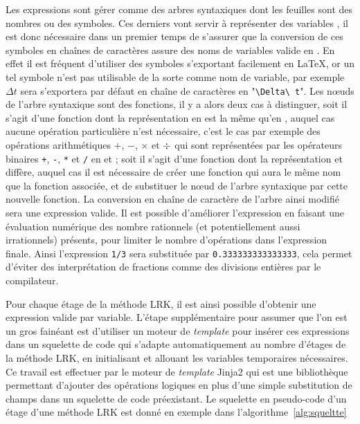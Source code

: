Les expressions \sympy{} sont gérer comme des arbres syntaxiques dont les feuilles sont des nombres ou des symboles. Ces derniers vont servir à représenter des variables \CC, il est donc nécessaire dans un premier temps de s'assurer que la conversion de ces symboles en chaînes de caractères assure des noms de variables valide en \CC. En effet il est fréquent d'utiliser des symboles s'exportant facilement en \LaTeX{}, or un tel symbole n'est pas utilisable de la sorte comme nom de variable, par exemple $\Delta t$ sera s'exportera par défaut en chaîne de caractères en "\texttt{\textbackslash Delta\textbackslash\ t}". Les nœuds de l'arbre syntaxique sont des fonctions, il y a alors deux cas à distinguer, soit il s'agit d'une fonction dont la représentation en \Python{} est la même qu'en \CC, auquel cas aucune opération particulière n'est nécessaire, c'est le cas par exemple des opérations arithmétiques $+$, $-$, $\times$ et $\divisionsymbol$ qui sont représentées par les opérateurs binaires \texttt{+}, \texttt{-}, \texttt{*} et \texttt{/} en \Python{} et \CC{} ; soit il s'agit d'une fonction dont la représentation \Python{} et \CC{} diffère, auquel cas il est nécessaire de créer une fonction \sympy{} qui aura le même nom que la fonction \CC{} associée, et de substituer le nœud de l'arbre syntaxique par cette nouvelle fonction. La conversion en chaîne de caractère de l'arbre ainsi modifié sera une expression \CC{} valide. Il est possible d'améliorer l'expression \CC{} en faisant une évaluation numérique des nombre rationnels (et potentiellement aussi irrationnels) présents, pour limiter le nombre d'opérations dans l'expression finale. Ainsi l'expression \texttt{1/3} sera substituée par \texttt{0.333333333333333}, cela permet d'éviter des interprétation de fractions comme des divisions entières par le compilateur.

Pour chaque étage de la méthode LRK, il est ainsi possible d'obtenir une expression \CC{} valide par variable. L'étape supplémentaire pour assumer que l'on est un gros fainéant est d'utiliser un moteur de \emph{template} pour insérer ces expressions dans un squelette de code qui s'adapte automatiquement au nombre d'étages de la méthode LRK, en initialisant et allouant les variables temporaires nécessaires. Ce travail est effectuer par le moteur de \emph{template} Jinja2 qui est une bibliothèque \Python{} permettant d'ajouter des opérations logiques en plus d'une simple substitution de champs dans un squelette de code préexistant. Le squelette en pseudo-code d'un étage d'une méthode LRK est donné en exemple dans l'algorithme~\ref{alg:squeltte}

